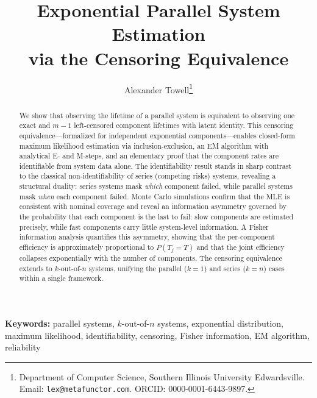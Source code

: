 \documentclass[12pt]{article}
\title{Exponential Parallel System Estimation\\via the Censoring Equivalence}
\author{Alexander Towell\thanks{Department of Computer Science,
  Southern Illinois University Edwardsville.
  Email: \texttt{lex@metafunctor.com}.
  ORCID: 0000-0001-6443-9897.}}
\date{}
\theoremstyle{definition}
\theoremstyle{remark}
\begin{document}
\maketitle

\begin{abstract}
We show that observing the lifetime of a parallel system is equivalent to
observing one exact and $m-1$ left-censored component lifetimes with latent
identity. This censoring equivalence---formalized for independent exponential
components---enables closed-form maximum likelihood estimation via
inclusion-exclusion, an EM algorithm with analytical E- and M-steps, and an
elementary proof that the component rates are identifiable from system data
alone. The identifiability result stands in sharp contrast to the classical
non-identifiability of series (competing risks) systems, revealing a
structural duality: series systems mask \emph{which} component failed,
while parallel systems mask \emph{when} each component failed. Monte Carlo
simulations confirm that the MLE is consistent with nominal coverage and
reveal an information asymmetry governed by the probability that each
component is the last to fail: slow components are estimated precisely,
while fast components carry little system-level information.  A Fisher
information analysis quantifies this asymmetry, showing that the
per-component efficiency is approximately proportional to $P(T_j = T)$
and that the joint efficiency collapses exponentially with the number of
components.  The censoring equivalence extends to $k$-out-of-$n$ systems,
unifying the parallel ($k = 1$) and series ($k = n$) cases within a
single framework.
\end{abstract}

\noindent\textbf{Keywords:} parallel systems, $k$-out-of-$n$ systems,
exponential distribution, maximum likelihood, identifiability, censoring,
Fisher information, EM algorithm, reliability












\end{document}
